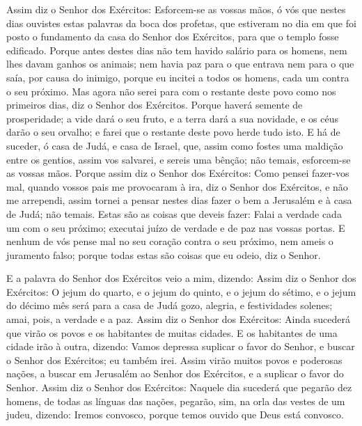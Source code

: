Assim diz o Senhor dos Exércitos: Esforcem-se as vossas mãos, ó
vós que nestes dias ouvistes estas palavras da boca dos profetas,
que estiveram no dia em que foi posto o fundamento da casa do Senhor
dos Exércitos, para que o templo fosse edificado. Porque
antes destes dias não tem havido salário para os homens, nem lhes
davam ganhos os animais; nem havia paz para o que entrava nem para o
que saía, por causa do inimigo, porque eu incitei a todos os homens,
cada um contra o seu próximo. Mas agora não serei para com o
restante deste povo como nos primeiros dias, diz o Senhor dos
Exércitos. Porque haverá semente de prosperidade; a vide dará
o seu fruto, e a terra dará a sua novidade, e os céus darão o seu
orvalho; e farei que o restante deste povo herde tudo isto. E
há de suceder, ó casa de Judá, e casa de Israel, que, assim como
fostes uma maldição entre os gentios, assim vos salvarei, e sereis
uma bênção; não temais, esforcem-se as vossas mãos. Porque
assim diz o Senhor dos Exércitos: Como pensei fazer-vos mal, quando
vossos pais me provocaram à ira, diz o Senhor dos Exércitos, e não
me arrependi, assim tornei a pensar nestes dias fazer o bem a
Jerusalém e à casa de Judá; não temais. Estas são as coisas
que deveis fazer: Falai a verdade cada um com o seu próximo;
executai juízo de verdade e de paz nas vossas portas. E
nenhum de vós pense mal no seu coração contra o seu próximo, nem
ameis o juramento falso; porque todas estas são coisas que eu odeio,
diz o Senhor.

E a palavra do Senhor dos Exércitos veio a mim, dizendo:
Assim diz o Senhor dos Exércitos: O jejum do quarto, e o
jejum do quinto, e o jejum do sétimo, e o jejum do décimo mês será
para a casa de Judá gozo, alegria, e festividades solenes; amai,
pois, a verdade e a paz. Assim diz o Senhor dos Exércitos:
Ainda sucederá que virão os povos e os habitantes de muitas cidades.
E os habitantes de uma cidade irão à outra, dizendo: Vamos
depressa suplicar o favor do Senhor, e buscar o Senhor dos
Exércitos; eu também irei. Assim virão muitos povos e
poderosas nações, a buscar em Jerusalém ao Senhor dos Exércitos, e a
suplicar o favor do Senhor. Assim diz o Senhor dos Exércitos:
Naquele dia sucederá que pegarão dez homens, de todas as línguas das
nações, pegarão, sim, na orla das vestes de um judeu, dizendo:
Iremos convosco, porque temos ouvido que Deus está convosco.

\medskip

